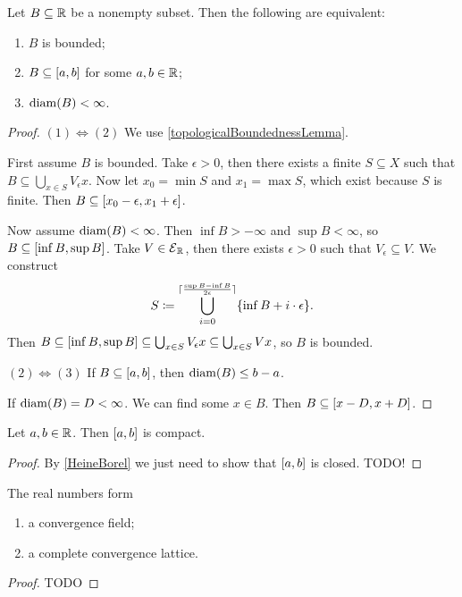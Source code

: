 \begin{proposition} \label{boundedSubsetsRealNumbers}
Let $B\subseteq \mathbb{R}$ be a nonempty subset. Then the following are equivalent:
\begin{enumerate}
\item $B$ is bounded;
\item $B\subseteq \interval{a,b}$ for some $a,b\in \mathbb{R}$;
\item $\operatorname{diam}(B) < \infty$.
\end{enumerate}
\end{proposition}
\begin{proof}
$(1) \Leftrightarrow (2)$ We use \ref{topologicalBoundednessLemma}.

First assume $B$ is bounded. Take $\epsilon>0$, then there exists a finite $S\subseteq X$ such that $B\subseteq \bigcup_{x\in S}V_\epsilon x$. Now let $x_0 = \min S$ and $x_1 = \max S$, which exist because $S$ is finite. Then $B\subseteq \interval{x_0-\epsilon, x_1+\epsilon}$.

Now assume $\operatorname{diam}(B) < \infty$. Then $\inf B > -\infty$ and $\sup B < \infty$, so $B\subseteq \interval{\inf B, \sup B}$. Take $V\in \operatorname{\mathcal{E}}_{\mathbb{R}}$, then there exists $\epsilon >0$ such that $V_\epsilon \subseteq V$. We construct
\[ S \coloneqq \bigcup_{i=0}^{\lceil\frac{\sup B - \inf B}{2\epsilon}\rceil}\{\inf B + i\cdot \epsilon\}. \]
Then $B\subseteq \interval{\inf B, \sup B} \subseteq \bigcup_{x\in S}V_\epsilon x \subseteq \bigcup_{x\in S}V x$, so $B$ is bounded.

$(2) \Leftrightarrow (3)$ If $B\subseteq \interval{a,b}$, then $\operatorname{diam}(B) \leq b-a$.

If $\operatorname{diam}(B) = D <\infty$. We can find some $x\in B$. Then $B\subseteq \interval{x-D, x+D}$.
\end{proof}
\begin{corollary} \label{closedRealIntervalCompact}
Let $a,b\in \mathbb{R}$. Then $\interval{a,b}$ is compact.
\end{corollary}
\begin{proof}
By \ref{HeineBorel} we just need to show that $\interval{a,b}$ is closed. TODO!
\end{proof}

\begin{proposition}
The real numbers form
\begin{enumerate}
\item a convergence field;
\item a complete convergence lattice.
\end{enumerate}
\end{proposition}
\begin{proof}
TODO
\end{proof}

